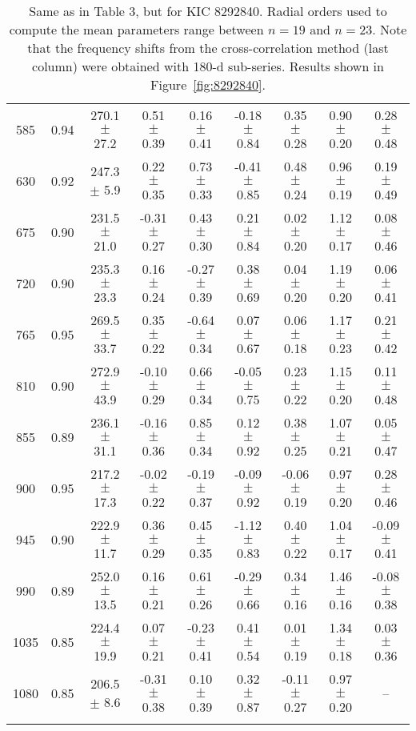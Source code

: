 \documentclass[twocolumn]{aastex61}%
\begin{document}
\begin{table*}[ht]
\begin{tabular}{ccc|ccccc|c}
585 & 0.94 & 270.1 $\pm$ 27.2 & 0.51 $\pm$ 0.39 & 0.16 $\pm$ 0.41 & -0.18 $\pm$ 0.84 & 0.35 $\pm$ 0.28 & 0.90 $\pm$ 0.20 & 0.28 $\pm$ 0.48\\
630 & 0.92 & 247.3 $\pm$ 5.9 & 0.22 $\pm$ 0.35 & 0.73 $\pm$ 0.33 & -0.41 $\pm$ 0.85 & 0.48 $\pm$ 0.24 & 0.96 $\pm$ 0.19 & 0.19 $\pm$ 0.49\\
675 & 0.90 & 231.5 $\pm$ 21.0 & -0.31 $\pm$ 0.27 & 0.43 $\pm$ 0.30 & 0.21 $\pm$ 0.84 & 0.02 $\pm$ 0.20 & 1.12 $\pm$ 0.17 & 0.08 $\pm$ 0.46\\
720 & 0.90 & 235.3 $\pm$ 23.3 & 0.16 $\pm$ 0.24 & -0.27 $\pm$ 0.39 & 0.38 $\pm$ 0.69 & 0.04 $\pm$ 0.20 & 1.19 $\pm$ 0.20 & 0.06 $\pm$ 0.41\\
765 & 0.95 & 269.5 $\pm$ 33.7 & 0.35 $\pm$ 0.22 & -0.64 $\pm$ 0.34 & 0.07 $\pm$ 0.67 & 0.06 $\pm$ 0.18 & 1.17 $\pm$ 0.23 & 0.21 $\pm$ 0.42\\
810 & 0.90 & 272.9 $\pm$ 43.9 & -0.10 $\pm$ 0.29 & 0.66 $\pm$ 0.34 & -0.05 $\pm$ 0.75 & 0.23 $\pm$ 0.22 & 1.15 $\pm$ 0.20 & 0.11 $\pm$ 0.48\\
855 & 0.89 & 236.1 $\pm$ 31.1 & -0.16 $\pm$ 0.36 & 0.85 $\pm$ 0.34 & 0.12 $\pm$ 0.92 & 0.38 $\pm$ 0.25 & 1.07 $\pm$ 0.21 & 0.05 $\pm$ 0.47\\
900 & 0.95 & 217.2 $\pm$ 17.3 & -0.02 $\pm$ 0.22 & -0.19 $\pm$ 0.37 & -0.09 $\pm$ 0.92 & -0.06 $\pm$ 0.19 & 0.97 $\pm$ 0.20 & 0.28 $\pm$ 0.46\\
945 & 0.90 & 222.9 $\pm$ 11.7 & 0.36 $\pm$ 0.29 & 0.45 $\pm$ 0.35 & -1.12 $\pm$ 0.83 & 0.40 $\pm$ 0.22 & 1.04 $\pm$ 0.17 & -0.09 $\pm$ 0.41\\
990 & 0.89 & 252.0 $\pm$ 13.5 & 0.16 $\pm$ 0.21 & 0.61 $\pm$ 0.26 & -0.29 $\pm$ 0.66 & 0.34 $\pm$ 0.16 & 1.46 $\pm$ 0.16 & -0.08 $\pm$ 0.38\\
1035 & 0.85 & 224.4 $\pm$ 19.9 & 0.07 $\pm$ 0.21 & -0.23 $\pm$ 0.41 & 0.41 $\pm$ 0.54 & 0.01 $\pm$ 0.19 & 1.34 $\pm$ 0.18 & 0.03 $\pm$ 0.36\\
1080 & 0.85 & 206.5 $\pm$ 8.6 & -0.31 $\pm$ 0.38 & 0.10 $\pm$ 0.39 & 0.32 $\pm$ 0.87 & -0.11 $\pm$ 0.27 & 0.97 $\pm$ 0.20 & --\\\vspace{-0.35cm}
\end{tabular}
\caption{Same as in Table 3, but for KIC 8292840. {Radial orders used to compute the mean parameters range between $n=19$ and $n=23$.} Note that the frequency shifts from the cross-correlation method (last column) were obtained with 180-d sub-series. Results shown in Figure~\ref{fig:8292840}.}\label{tab:8292840}\vspace{-0.2cm}
\end{table*}
\end{document}
